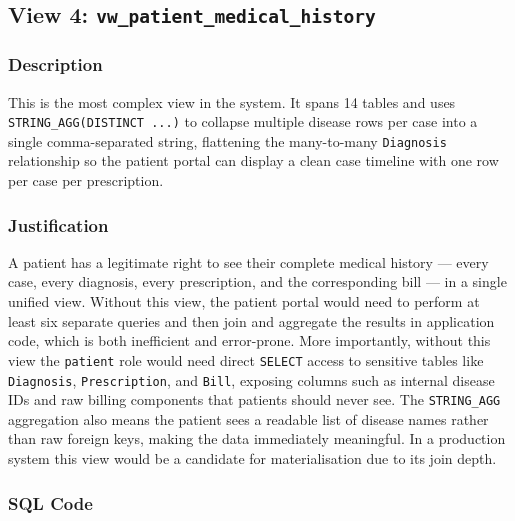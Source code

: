 \documentclass{article}
\begin{document}
\vspace{1em}
\vspace{1em}
\vspace{1em}
\subsection{View 4: \texttt{vw\_patient\_medical\_history}}

\subsubsection{Description}
This is the most complex view in the system. It spans 14 tables and uses \texttt{STRING\_AGG(DISTINCT ...)} to collapse multiple disease rows per case into a single comma-separated string, flattening the many-to-many \texttt{Diagnosis} relationship so the patient portal can display a clean case timeline with one row per case per prescription.

\subsubsection{Justification}
A patient has a legitimate right to see their complete medical history --- every case, every diagnosis, every prescription, and the corresponding bill --- in a single unified view. Without this view, the patient portal would need to perform at least six separate queries and then join and aggregate the results in application code, which is both inefficient and error-prone. More importantly, without this view the \texttt{patient} role would need direct \texttt{SELECT} access to sensitive tables like \texttt{Diagnosis}, \texttt{Prescription}, and \texttt{Bill}, exposing columns such as internal disease IDs and raw billing components that patients should never see. The \texttt{STRING\_AGG} aggregation also means the patient sees a readable list of disease names rather than raw foreign keys, making the data immediately meaningful. In a production system this view would be a candidate for materialisation due to its join depth.

\subsubsection{SQL Code}
\end{document}
